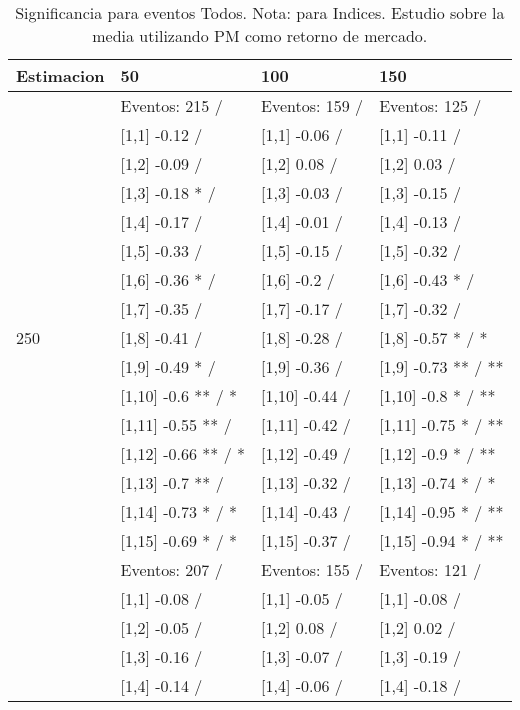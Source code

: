 \begin{table}

\caption{Significancia para eventos Todos. Nota: para Indices. Estudio sobre la media utilizando PM como retorno de mercado.}
\centering
\begin{tabular}[t]{llll}
\toprule
Estimacion & 50 & 100 & 150\\
\midrule
 & Eventos:  215 / & Eventos:  159 / & Eventos:  125 /\\
 & {}[1,1] -0.12  / & {}[1,1] -0.06  / & {}[1,1] -0.11  /\\
 & {}[1,2] -0.09  / & {}[1,2] 0.08  / & {}[1,2] 0.03  /\\
 & {}[1,3] -0.18 * / & {}[1,3] -0.03  / & {}[1,3] -0.15  /\\
 & {}[1,4] -0.17  / & {}[1,4] -0.01  / & {}[1,4] -0.13  /\\
\addlinespace
 & {}[1,5] -0.33  / & {}[1,5] -0.15  / & {}[1,5] -0.32  /\\
 & {}[1,6] -0.36 * / & {}[1,6] -0.2  / & {}[1,6] -0.43 * /\\
 & {}[1,7] -0.35  / & {}[1,7] -0.17  / & {}[1,7] -0.32  /\\
250 & {}[1,8] -0.41  / & {}[1,8] -0.28  / & {}[1,8] -0.57 * / *\\
 & {}[1,9] -0.49 * / & {}[1,9] -0.36  / & {}[1,9] -0.73 ** / **\\
\addlinespace
 & {}[1,10] -0.6 ** / * & {}[1,10] -0.44  / & {}[1,10] -0.8 * / **\\
 & {}[1,11] -0.55 ** / & {}[1,11] -0.42  / & {}[1,11] -0.75 * / **\\
 & {}[1,12] -0.66 ** / * & {}[1,12] -0.49  / & {}[1,12] -0.9 * / **\\
 & {}[1,13] -0.7 ** / & {}[1,13] -0.32  / & {}[1,13] -0.74 * / *\\
 & {}[1,14] -0.73 * / * & {}[1,14] -0.43  / & {}[1,14] -0.95 * / **\\
\addlinespace
 & {}[1,15] -0.69 * / * & {}[1,15] -0.37  / & {}[1,15] -0.94 * / **\\
 & Eventos:  207 / & Eventos:  155 / & Eventos:  121 /\\
 & {}[1,1] -0.08  / & {}[1,1] -0.05  / & {}[1,1] -0.08  /\\
 & {}[1,2] -0.05  / & {}[1,2] 0.08  / & {}[1,2] 0.02  /\\
 & {}[1,3] -0.16  / & {}[1,3] -0.07  / & {}[1,3] -0.19  /\\
\addlinespace
 & {}[1,4] -0.14  / & {}[1,4] -0.06  / & {}[1,4] -0.18  /\\

\end{tabular}
\end{table}
